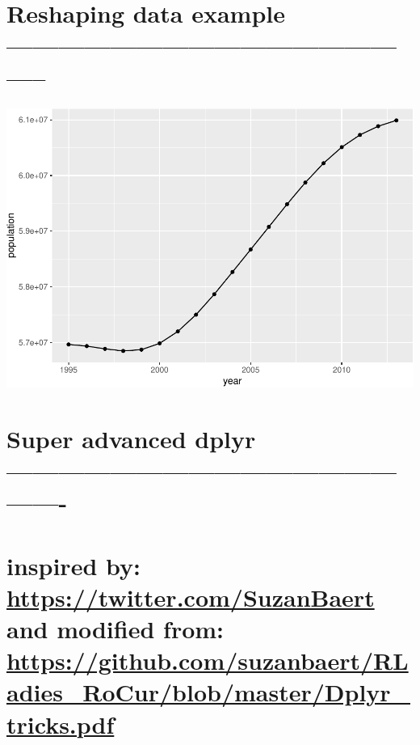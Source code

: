\documentclass[]{article}
\newenvironment{Shaded}{\begin{snugshade}}{\end{snugshade}}
\newcommand{\DataTypeTok}[1]{\textcolor[rgb]{0.13,0.29,0.53}{#1}}
\newcommand{\KeywordTok}[1]{\textcolor[rgb]{0.13,0.29,0.53}{\textbf{#1}}}
\newcommand{\NormalTok}[1]{#1}
\newcommand{\OperatorTok}[1]{\textcolor[rgb]{0.81,0.36,0.00}{\textbf{#1}}}
\newcommand{\StringTok}[1]{\textcolor[rgb]{0.31,0.60,0.02}{#1}}
\begin{document}
\hypertarget{reshaping-data-example}{%
\section{Reshaping data example
--------------------------------------------------}\label{reshaping-data-example}}

\begin{Shaded}
\end{Shaded}

\includegraphics{R_tidyverse_for_geographers_files/figure-latex/unnamed-chunk-31-1.pdf}

\hypertarget{super-advanced-dplyr--}{%
\section{Super advanced dplyr
----------------------------------------------------}\label{super-advanced-dplyr--}}

\hypertarget{inspired-by-httpstwitter.comsuzanbaert-and-modified-from-httpsgithub.comsuzanbaertrladies_rocurblobmasterdplyr_tricks.pdf}{%
\section{\texorpdfstring{inspired by:
\url{https://twitter.com/SuzanBaert} and modified from:
\url{https://github.com/suzanbaert/RLadies_RoCur/blob/master/Dplyr_tricks.pdf}}{inspired by: https://twitter.com/SuzanBaert and modified from: https://github.com/suzanbaert/RLadies\_RoCur/blob/master/Dplyr\_tricks.pdf}}\label{inspired-by-httpstwitter.comsuzanbaert-and-modified-from-httpsgithub.comsuzanbaertrladies_rocurblobmasterdplyr_tricks.pdf}}
\end{document}
